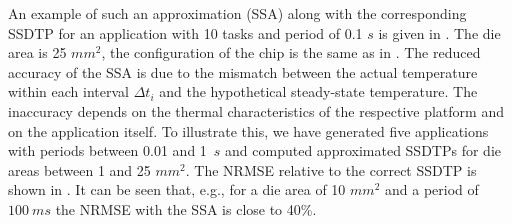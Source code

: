 An example of such an approximation (SSA) along with the corresponding SSDTP for an application with 10 tasks and period of 0.1 $s$ is given in . The die area is 25 $mm^2$, the configuration of the chip is the same as in . The reduced accuracy of the SSA is due to the mismatch between the actual temperature within each interval $\Delta t_i$ and the hypothetical steady-state temperature. The inaccuracy depends on the thermal characteristics of the respective platform and on the application itself. To illustrate this, we have generated five applications with periods between 0.01 and 1~$s$ and computed approximated SSDTPs for die areas between 1 and 25 $mm^2$. The NRMSE relative to the correct SSDTP is shown in . It can be seen that, e.g., for a die area of 10 $mm^2$ and a period of $100~ms$ the NRMSE with the SSA is close to 40\%.
